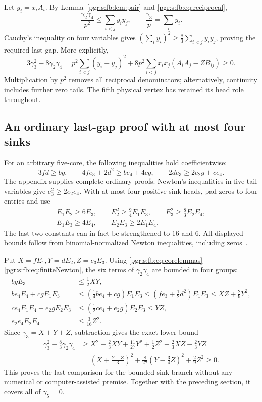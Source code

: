 \documentclass[11pt]{article}
\numberwithin{equation}{section}
\theoremstyle{definition}\newtheorem{definition}[theorem]{Definition}\newtheorem{remark}[theorem]{Remark}
\begin{document}
Let $y_i=x_iA_i$. By Lemma~\ref{pgr:s:fb:lem:pair} and \eqref{pgr:s:fb:eq:reciprocal},
\[
 \frac{\gamma_2\gamma_4}{p^2}\le\sum_{i<j}y_iy_j,
 \qquad \frac{\gamma_3}{p}=\sum_i y_i.
\]
Cauchy's inequality on four variables gives $(\sum_i y_i)^2\ge\tfrac83\sum_{i<j}y_iy_j$, proving the required last gap. More explicitly,
\[
 3\gamma_3^2-8\gamma_2\gamma_4
 =p^2\sum_{i<j}(y_i-y_j)^2
   +8p^2\sum_{i<j}x_ix_j(A_iA_j-ZB_{ij})\ge0.
\]
Multiplication by $p^2$ removes all reciprocal denominators; alternatively, continuity includes further zero tails. The fifth physical vertex has retained its head role throughout.

\subsection{An ordinary last-gap proof with at most four sinks}
For an arbitrary five-core, the following inequalities hold coefficientwise:
\begin{equation}\label{pgr:s:fb:eq:corelemmas}
 3fd\ge bg,\qquad 4fe_3+2d^2\ge be_4+4cg,
 \qquad 2de_3\ge2e_2g+ce_4.
\end{equation}
The appendix supplies complete ordinary proofs. Newton's inequalities in five tail variables give $e_3^2\ge2e_2e_4$. With at most four positive sink heads, pad zeros to four entries and use
\begin{equation}\label{pgr:s:fb:eq:finiteNewton}
\begin{gathered}
 E_1E_2\ge6E_3,\qquad E_2^2\ge\tfrac94E_1E_3,\qquad
 E_3^2\ge\tfrac83E_2E_4,\\
 E_1E_3\ge4E_4,\qquad E_2E_3\ge2E_1E_4.
\end{gathered}
\end{equation}
The last two constants can in fact be strengthened to $16$ and $6$. All displayed bounds follow from binomial-normalized Newton inequalities, including zeros~\cite{BH}.

Put $X=fE_1,Y=dE_2,Z=e_3E_3$. Using \eqref{pgr:s:fb:eq:corelemmas}--\eqref{pgr:s:fb:eq:finiteNewton}, the six terms of $\gamma_2\gamma_4$ are bounded in four groups:
\begin{align*}
 bgE_3&\le\tfrac12XY,\\
 be_4E_4+cgE_1E_3
 &\le(\tfrac14be_4+cg)E_1E_3
 \le(fe_3+\tfrac12d^2)E_1E_3
 \le XZ+\tfrac29Y^2,\\
 ce_4E_1E_4+e_2gE_2E_3
 &\le(\tfrac12ce_4+e_2g)E_2E_3\le YZ,\\
 e_2e_4E_2E_4&\le\tfrac{3}{16}Z^2.
\end{align*}
Since $\gamma_3=X+Y+Z$, subtraction gives the exact lower bound
\begin{align*}
 \gamma_3^2-\tfrac83\gamma_2\gamma_4
 &\ge X^2+\tfrac23XY+\tfrac{11}{27}Y^2+\tfrac12Z^2
       -\tfrac23XZ-\tfrac23YZ\\
 &=\left(X+\frac{Y-Z}{3}\right)^2
   +\frac8{27}\left(Y-\frac34Z\right)^2+\frac29Z^2\ge0.
\end{align*}
This proves the last comparison for the bounded-sink branch without any numerical or computer-assisted premise. Together with the preceding section, it covers all of $\gamma_5=0$.
\end{document}
